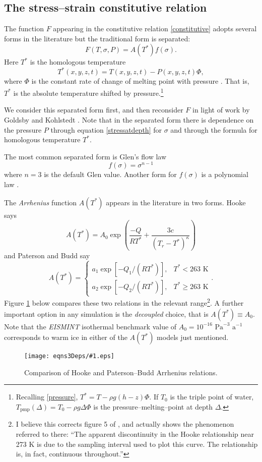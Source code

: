 \documentclass[12pt,final]{amsart}%
\theoremstyle{plain}
\theoremstyle{definition}
\theoremstyle{remark}
\newcommand{\regfigure}[2]{\texttt{[image: eqns3Deps/\#1.eps]}}
\newcommand{\Tpmp}{T_{\text{pmp}}}
\begin{document}
\subsection*{The stress--strain constitutive relation}\label{Fsubsect}  The function $F$ appearing in the constitutive relation \eqref{constitutive} adopts several forms in the literature but the traditional form is separated:
\begin{equation}\label{tradF}
F(T,\sigma,P)=A(T^*) f(\sigma).
\end{equation}
Here $T^*$ is the homologous temperature
    $$T^*(x,y,z,t) = T(x,y,z,t) - P(x,y,z,t) \Phi,$$
where $\Phi$ is the constant rate of change of melting point with pressure \citep{PayneBaldwin}.  That is, $T^*$ is the absolute temperature shifted by pressure.\footnote{Recalling \eqref{pressure}, $T^*=T-\rho g (h-z) \Phi$.  If $T_0$ is the triple point of water, $\Tpmp(\Delta) = T_0 - \rho g \Delta \Phi$ is the pressure--melting--point at depth $\Delta$.}

We consider this separated form first, and then reconsider $F$ in light of work by Goldsby and Kohlstedt \citep{GoldsbyKohlstedt}.  Note that in the separated form there is dependence on the pressure $P$ through equation \eqref{stressatdepth} for $\sigma$ and through the formula for homologous temperature $T^*$.

The most common separated form is Glen's flow law \citep{Glen}
    $$f(\sigma)=\sigma^{n-1}$$
where $n=3$ is the default Glen value.  Another form for $f(\sigma)$ is a polynomial law \citep{Hutter93}.

The \emph{Arrhenius} function $A(T^*)$ appears in the literature in two forms.  Hooke \citep{Hooke} says
    $$A(T^*) = A_0 \exp\left(\frac{-Q}{R T^*} + \frac{3c}{(T_r - T^*)^\kappa}\right)$$
and Paterson and Budd \citep{PatersonBudd} say
\begin{equation}\label{PatBuddArr}
A(T^*) = \begin{cases} a_1 \exp\left[-Q_1/(R T^*)\right], &T^*<263 \text{ K} \\
a_2 \exp\left[-Q_2/(R T^*)\right], &T^*\ge 263 \text{ K} \end{cases}.
\end{equation}
Figure \ref{arrfig} below compares these two relations in the relevant range\footnote{I believe this corrects figure 5 of \citep{PayneBaldwin}, and actually shows the phenomenon referred to there: ``The apparent discontinuity in the Hooke relationship near 273 K is due to the sampling interval used to plot this curve.  The relationship is, in fact, continuous throughout.''}.  A further important option in any simulation is the \emph{decoupled} choice, that is $A(T^*)\equiv A_0$.  Note that the \emph{EISMINT} isothermal benchmark \citep{EISMINT96} value of $A_0=10^{-16}$ $\text{Pa}^{-3}$ $\text{a}^{-1}$ corresponds to warm ice in either of the $A(T^*)$ models just mentioned.
\begin{figure}[ht]
\regfigure{arrfig}{2}
\caption{Comparison of Hooke \citep{Hooke} and Paterson--Budd \citep{PatersonBudd} Arrhenius relations.}
\label{arrfig}
\end{figure}
\end{document}
